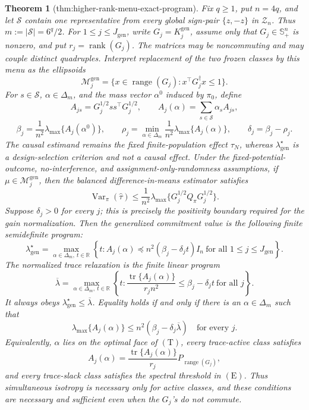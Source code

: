 \documentclass{article}
\newtheorem{theorem}{Theorem}
\begin{document}
\begin{theorem}[thm:higher-rank-menu-exact-program]\label{thm:higher-rank-menu-exact-program}
Fix \(q\ge1\), put \(n=4q\), and let \(\mathscr S\) contain one representative from every global sign-pair \(\{z,-z\}\) in \(\mathcal Z_n\). Thus \(m:=|\mathscr S|=6^q/2\). For \(1\le j\le J_{\mathrm{gen}}\), write \(G_j=K_j^{\mathrm{gen}}\), assume only that \(G_j\in\mathbb S_+^n\) is nonzero, and put \(r_j=\operatorname{rank}(G_j)\). The matrices may be noncommuting and may couple distinct quadruples. Interpret replacement of the two frozen classes by this menu as the ellipsoids
\[
\mathcal M_j^{\mathrm{gen}}
=\{x\in\operatorname{range}(G_j):x^\top G_j^\dagger x\le1\}.
\]
For \(s\in\mathscr S\), \(\alpha\in\Delta_m\), and the mass vector \(\alpha^0\) induced by \(\pi_0\), define
\[
A_{js}=G_j^{1/2}ss^\top G_j^{1/2},
\qquad
A_j(\alpha)=\sum_{s\in\mathscr S}\alpha_sA_{js},
\]
\[
\beta_j=\frac1{n^2}\lambda_{\max}\{A_j(\alpha^0)\},
\qquad
\rho_j=\min_{\alpha\in\Delta_m}\frac1{n^2}\lambda_{\max}\{A_j(\alpha)\},
\qquad
\delta_j=\beta_j-\rho_j.
\]
The causal estimand remains the fixed finite-population effect \(\tau_N\), whereas \(\lambda_{\mathrm{gen}}^\star\) is a design-selection criterion and not a causal effect. Under the fixed-potential-outcome, no-interference, and assignment-only-randomness assumptions, if \(\mu\in\mathcal M_j^{\mathrm{gen}}\), then the balanced difference-in-means estimator satisfies
\[
\operatorname{Var}_\pi(\widehat\tau)
\le \frac1{n^2}\lambda_{\max}
\{G_j^{1/2}Q_\pi G_j^{1/2}\}.
\]
Suppose \(\delta_j>0\) for every \(j\); this is precisely the positivity boundary required for the gain normalization. Then the generalized commitment value is the following finite semidefinite program:
\[
\boxed{
\lambda_{\mathrm{gen}}^\star
=\max_{\alpha\in\Delta_m,\ t\in\mathbb R}
\left\{t:
A_j(\alpha)\preceq n^2(\beta_j-\delta_jt)I_n
\ \text{for all }1\le j\le J_{\mathrm{gen}}
\right\}.}
\tag{P}
\]
The normalized trace relaxation is the finite linear program
\[
\overline\lambda
=\max_{\alpha\in\Delta_m,\ t\in\mathbb R}
\left\{t:
\frac{\operatorname{tr}\{A_j(\alpha)\}}{r_jn^2}
\le\beta_j-\delta_jt
\ \text{for all }j
\right\}.
\tag{T}
\]
It always obeys \(\lambda_{\mathrm{gen}}^\star\le\overline\lambda\). Equality holds if and only if there is an \(\alpha\in\Delta_m\) such that
\[
\lambda_{\max}\{A_j(\alpha)\}
\le n^2(\beta_j-\delta_j\overline\lambda)
\quad\text{for every }j.
\tag{E}
\]
Equivalently, \(\alpha\) lies on the optimal face of \((\mathrm T)\), every trace-active class satisfies
\[
A_j(\alpha)
=\frac{\operatorname{tr}\{A_j(\alpha)\}}{r_j}
P_{\operatorname{range}(G_j)},
\tag{I}
\]
and every trace-slack class satisfies the spectral threshold in \((\mathrm E)\). Thus simultaneous isotropy is necessary only for active classes, and these conditions are necessary and sufficient even when the \(G_j\)'s do not commute.


\end{theorem}
\end{document}
